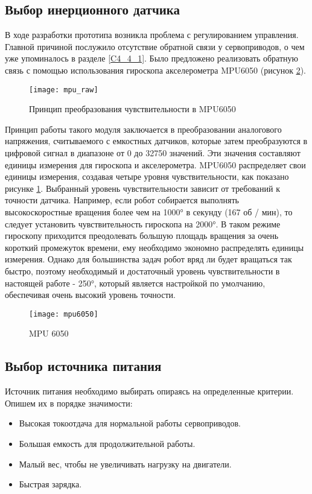 \subsection{Выбор инерционного датчика}\label{C4_4_3}

В ходе разработки прототипа возникла проблема с регулированием управления. Главной причиной послужило отсутствие обратной связи у сервоприводов, о чем уже упоминалось в разделе \ref{C4_4_1}. Было предложено реализовать обратную связь с помощью использования гироскопа акселерометра MPU6050 (рисунок \ref{mpu6050}).
\begin{figure}[h!]
	\begin{center}
		\texttt{[image: mpu\_raw]}
		\caption{Принцип преобразования чувствительности в MPU6050}
		\label{mpu_raw}
	\end{center}
\end{figure}

Принцип работы такого модуля заключается в преобразовании аналогового напряжения, считываемого с емкостных датчиков, которые затем преобразуются в цифровой сигнал в диапазоне от 0 до 32750 значений. Эти значения составляют единицы измерения для гироскопа и акселерометра. MPU6050 распределяет свои единицы измерения, создавая четыре уровня чувствительности, как показано рисунке \ref{mpu_raw}. Выбранный уровень чувствительности зависит от требований к точности датчика. Например, если робот собирается выполнять высокоскоростные вращения более чем на 1000° в секунду (167 об / мин), то следует установить чувствительность гироскопа на 2000°. В таком режиме гироскопу приходится преодолевать большую площадь вращения за очень короткий промежуток времени, ему необходимо экономно распределять единицы измерения. Однако для большинства задач робот вряд ли будет вращаться так быстро, поэтому необходимый и достаточный уровень чувствительности в настоящей работе - 250°, который является настройкой по умолчанию, обеспечивая очень высокий уровень точности.
\newpage
\begin{figure}[h!]
	\begin{center}
		\texttt{[image: mpu6050]}
		\caption{MPU 6050}
		\label{mpu6050}
	\end{center}
\end{figure}

\subsection{Выбор источника питания}\label{C4_4_4}
Источник питания необходимо выбирать опираясь на определенные критерии. Опишем их в порядке значимости:
\begin{itemize}
	\item Высокая токоотдача для нормальной работы сервоприводов.
	\item Большая емкость для продолжительной работы.
	\item Малый вес, чтобы не увеличивать нагрузку на двигатели.
	\item Быстрая зарядка.
\end{itemize}

